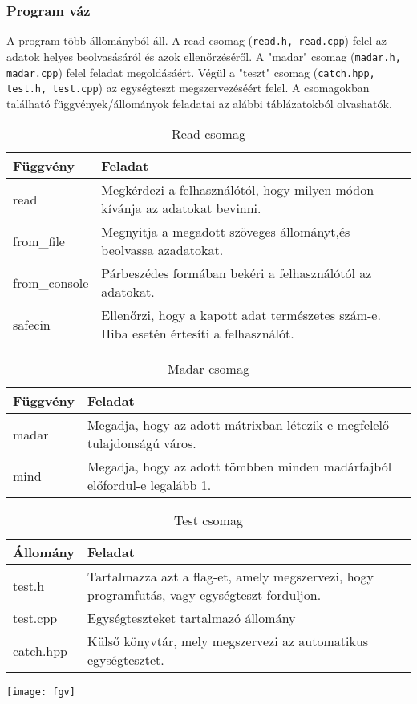 \documentclass[a4paper]{article}
\begin{document}
      \subsubsection{Program váz}
      A program több állományból áll. A read csomag (\texttt{read.h, read.cpp}) felel az adatok helyes beolvasásáról és azok ellenőrzéséről. A "madar" csomag (\texttt{madar.h, madar.cpp}) felel feladat megoldásáért. Végül a "teszt" csomag (\texttt{catch.hpp, test.h, test.cpp}) az egységteszt megszervezéséért felel. A csomagokban található függvények/állományok feladatai az alábbi táblázatokból olvashatók.
      \begin{table}[H]
        \caption*{Read csomag}
        \begin{tabular}{l|l}
          \toprule
          Függvény & Feladat \\
          \midrule
          read & Megkérdezi a felhasználótól, hogy milyen módon kívánja az adatokat bevinni.\\
          from\_file &  Megnyitja a megadott szöveges állományt,és beolvassa azadatokat.\\
          from\_console & Párbeszédes formában bekéri a felhasználótól az adatokat.\\
          safecin & Ellenőrzi, hogy a kapott adat természetes szám-e. Hiba esetén értesíti a felhasználót.\\
          \bottomrule
        \end{tabular}
      \end{table}
      \begin{table}[H]
        \caption*{Madar csomag}
        \begin{tabular}{l|l}
          \toprule
          Függvény & Feladat \\
          \midrule
          madar & Megadja, hogy az adott mátrixban létezik-e megfelelő tulajdonságú város.\\
          mind &  Megadja, hogy az adott tömbben minden madárfajból előfordul-e legalább 1.\\
          \bottomrule
        \end{tabular}
      \end{table}
      \begin{table}[H]
        \caption*{Test csomag}
        \begin{tabular}{l|l}
          \toprule
          Állomány & Feladat \\
          \midrule
          test.h & Tartalmazza azt a flag-et, amely megszervezi, hogy programfutás, vagy egységteszt forduljon.\\
          test.cpp & Egységteszteket tartalmazó állomány\\
          catch.hpp & Külső könyvtár, mely megszervezi az automatikus egységtesztet.\\
          \bottomrule
        \end{tabular}
      \end{table}
      \texttt{[image: fgv]}
\end{document}
